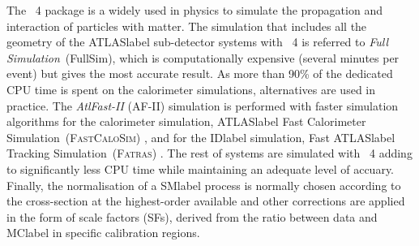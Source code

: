 The \GEANT~4 package %
is a widely used in physics to simulate the propagation and interaction of particles with matter. The simulation that includes all the geometry of the \acrshort{ATLASlabel} sub-detector systems with \GEANT~4 is referred to \textit{Full Simulation}~(FullSim), which is computationally expensive (several minutes per event) but gives the most accurate result. As more than 90\% of the dedicated CPU time is spent on the calorimeter simulations, alternatives are used in practice. The \textit{AtlFast-II} (AF-II) simulation is performed with faster simulation algorithms for the calorimeter simulation, \acrshort{ATLASlabel} Fast Calorimeter Simulation~(\textsc{FastCaloSim}) %
, and for the \acrshort{IDlabel} simulation, Fast \acrshort{ATLASlabel} Tracking Simulation~(\textsc{Fatras}) %
. The rest of systems are simulated with \GEANT~4 adding to significantly less CPU time while maintaining an adequate level of accuary. Finally, the normalisation of a \acrshort{SMlabel} process is normally chosen according to the cross-section at the highest-order available and other corrections are applied in the form of scale factors (SFs), derived from the ratio between data and \acrshort{MClabel} in specific calibration regions.

